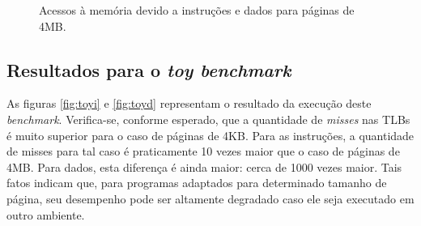 \documentclass[12pt]{article}
\begin{document}
\begin{figure}[h]
  \hfill
  \caption{Acessos à memória devido a instruções e dados para páginas de 4MB.}
  \label{fig:acessos}
\end{figure}


\subsection{Resultados para o \textit{toy benchmark}}

As figuras \ref{fig:toyi} e \ref{fig:toyd} representam o resultado da execução
deste \textit{benchmark}. Verifica-se, conforme esperado, que a quantidade de
\textit{misses} nas TLBs é muito superior para o caso de páginas de 4KB. Para as
instruções, a quantidade de misses para tal caso é praticamente 10 vezes maior
que o caso de páginas de 4MB. Para dados, esta diferença é ainda maior: cerca de
1000 vezes maior. Tais fatos indicam que, para programas adaptados para
determinado tamanho de página, seu desempenho pode ser altamente degradado caso
ele seja executado em outro ambiente. 
\end{document}
